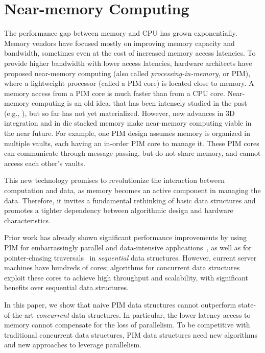 \section{Near-memory Computing}

The performance gap between memory and CPU has grown exponentially. Memory vendors have focused mostly on improving memory capacity and bandwidth, sometimes even at the cost of increased memory access latencies. To provide higher bandwidth with lower access latencies, hardware architects have proposed near-memory computing (also called \textit{processing-in-memory}, or PIM), where a lightweight processor (called a PIM core) is located close to memory. A memory access from a PIM core is much faster than from a CPU core. 
Near-memory computing is an old idea, that has been intensely studied in the past 
(e.g., \cite{Stone1970, Kogge1994, Gokhale1995, Patterson1997, Oskin1998, KangHYKGLTP99, Hall1999}), 
but so far has not yet materialized. However, new advances in 3D integration and in die stacked memory make near-memory computing viable in the near future. 
For example, one PIM design assumes memory is organized in multiple vaults, each having an in-order PIM core to manage it. These PIM cores
can communicate through message passing, but do not share memory, and cannot access each other's vaults. 

This new technology promises to revolutionize the interaction between computation and data, as memory becomes an active component in managing the data. Therefore, it invites a fundamental rethinking of basic data structures and promotes a tighter dependency between algorithmic design and hardware characteristics. 

Prior work has already shown significant performance improvements by using PIM for embarrassingly parallel 
and data-intensive applications~\cite{Zhang2014:TTP, Ahn2015:2, ZhuASSHPF13, Akin2015:DRM}, 
as well as for pointer-chasing traversals~\cite{hsieh2016accelerating} in \emph{sequential} data structures. 
However, current server machines have hundreds of cores; algorithms for 
concurrent data structures exploit these cores to achieve high throughput and 
scalability, with significant benefits over sequential data structures. 

In this paper, we show that
  naive PIM data structures cannot outperform 
 state-of-the-art \emph{concurrent} data structures. In particular, 
the lower latency access to memory cannot compensate for the loss of 
parallelism. To be competitive with traditional concurrent data structures, 
PIM data structures need new algorithms and new approaches to leverage parallelism.  

